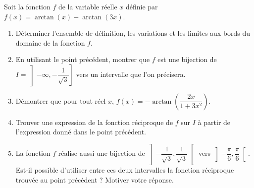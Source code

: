 
\begin{exercice}\label{exoautoanalyseCTU-46}

Soit la fonction $f$ de la variable réelle $x$ définie par $f(x)=\arctan (x) - \arctan (3x)$.
\begin{enumerate}
    \item Déterminer l'ensemble de définition, les variations et les limites aux bords du domaine de la fonction $f$.
    \item En utilisant le point précédent, montrer que $f$ est une bijection de $I=\left]-\infty, -\dfrac{1}{\sqrt{3}}\right]$ vers un intervalle que l'on précisera.
    \item Démontrer que pour tout réel $x$, $f(x)=-\arctan \left(\dfrac{2x}{1+3x^2}\right)$. 
    \item Trouver une expression de la fonction réciproque de $f$ sur $I$ à partir de l'expression donné dans le point précédent. 
    \item La fonction $f$ réalise aussi une bijection de $\left] -\dfrac{1}{\sqrt{3}}, \dfrac{1}{\sqrt{3}}\right[$ vers $\left] -\dfrac{\pi}{6},\dfrac{\pi}{6}\right[$. Est-il possible d'utiliser entre ces deux intervalles la fonction réciproque trouvée au point précédent ? Motiver votre réponse.
\end{enumerate}

\end{exercice}
